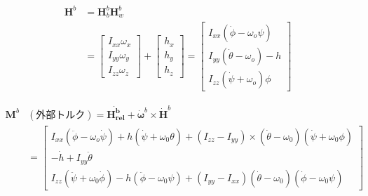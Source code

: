 \documentclass[class=article, crop=false, dvipdfmx]{standalone}
\begin{document}
\begin{align}
\bm{H}^b&=
\bm{H}_b^b \bm{H}_w^b\\
 &=
 \begin{bmatrix}
 I_{xx}\omega_x\\
  I_{yy}\omega_y\\
   I_{zz}\omega_z
 \end{bmatrix}
 +
 \begin{bmatrix}
 h_x\\
 h_y\\
 h_z
 \end{bmatrix}
=
\begin{bmatrix}
I_{xx}(\dot{\phi}-\omega_o\psi)\\
I_{yy}(\dot{\theta}-\omega_o)-h\\
I_{zz}(\dot{\psi}+\omega_o) \phi
\end{bmatrix}
\end{align}

\begin{align}
\bm{M}^b&
(\text{外部トルク})
=
\dot{\bm{H_{rel}^b}} +
\dot{\bm{\omega}}^b \times \dot{\bm{H}}^b\\
&=
\begin{bmatrix}
I_{xx}(\ddot{\phi} -\omega_o\dot{\psi}) + 
h(\dot{\psi}+\omega_0 \theta)+
(I_{zz} - I_{yy})\times
(\dot{\theta}-\omega_0)
(\dot{\psi}+\omega_0 \phi)\\
-\dot{h}+I_{yy}\ddot{\theta}\\
I_{zz}(\ddot{\psi}+\omega_0 \dot{\phi})
-h(\ddot{\phi}-\omega_0\psi)+
(I_{yy}-I_{xx})
(\dot{\theta}-\omega_0)
(\dot{\phi}-\omega_0\psi)
\end{bmatrix}
\end{align}
\end{document}
